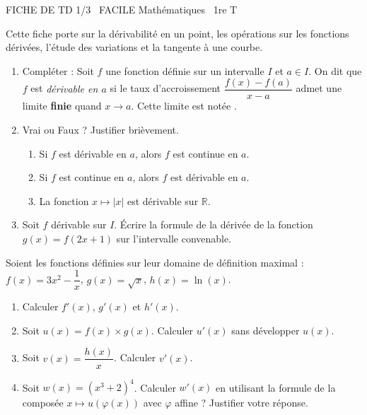 \documentclass[11pt]{article}
\begin{document}
\begin{tcolorbox}[enhanced,colback=popink,colframe=popink,arc=10pt,boxrule=0pt,left=12pt,right=12pt,top=9pt,bottom=9pt]
{\color{white}\popxbold\small FICHE DE TD 1/3 \textbullet\ FACILE \hfill Mathématiques \textbullet\ 1re T\par}
\end{tcolorbox}
\vspace{4pt}
Cette fiche porte sur la dérivabilité en un point, les opérations sur les fonctions dérivées, l'étude des variations et la tangente à une courbe.

\begin{exercice}
\begin{enumerate}
    \item Compléter : Soit $f$ une fonction définie sur un intervalle $I$ et $a \in I$. On dit que $f$ est \textit{dérivable en $a$} si le taux d'accroissement $\dfrac{f(x)-f(a)}{x-a}$ admet une limite \textbf{finie} quand $x \to a$. Cette limite est notée \underline{\hspace{4cm}}.
    \item Vrai ou Faux ? Justifier brièvement.
    \begin{enumerate}
        \item Si $f$ est dérivable en $a$, alors $f$ est continue en $a$.
        \item Si $f$ est continue en $a$, alors $f$ est dérivable en $a$.
        \item La fonction $x \mapsto |x|$ est dérivable sur $\mathbb{R}$.
    \end{enumerate}
    \item Soit $f$ dérivable sur $I$. Écrire la formule de la dérivée de la fonction $g(x) = f(2x+1)$ sur l'intervalle convenable.
\end{enumerate}
\end{exercice}

\begin{exercice}
Soient les fonctions définies sur leur domaine de définition maximal :
$f(x) = 3x^2 - \dfrac{1}{x}$, \quad $g(x) = \sqrt{x}$, \quad $h(x) = \ln(x)$.
\begin{enumerate}
    \item Calculer $f'(x)$, $g'(x)$ et $h'(x)$.
    \item Soit $u(x) = f(x) \times g(x)$. Calculer $u'(x)$ sans développer $u(x)$.
    \item Soit $v(x) = \dfrac{h(x)}{x}$. Calculer $v'(x)$.
    \item Soit $w(x) = (x^3+2)^4$. Calculer $w'(x)$ en utilisant la formule de la composée $x \mapsto u(\varphi(x))$ avec $\varphi$ affine ? Justifier votre réponse.
\end{enumerate}
\end{exercice}
\end{document}
